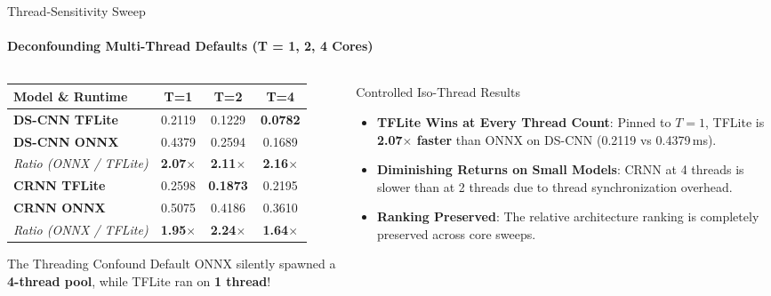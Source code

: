 \documentclass[aspectratio=169]{beamer}
\begin{document}
\begin{frame}{Thread-Sensitivity Sweep}
\framesubtitle{Deconfounding Multi-Thread Defaults (T = 1, 2, 4 Cores)}
\begin{columns}[T]
  \begin{column}{0.48\textwidth}
    \begin{table}[h]
    \centering
    \scriptsize
    \setlength{\tabcolsep}{3pt}
    \begin{tabular}{lccc}
    \toprule
    \textbf{Model \& Runtime} & \textbf{T=1} & \textbf{T=2} & \textbf{T=4} \\
    \midrule
    \textbf{DS-CNN TFLite} & 0.2119 & 0.1229 & \textbf{0.0782} \\
    \textbf{DS-CNN ONNX}   & 0.4379 & 0.2594 & 0.1689 \\
    \textit{Ratio (ONNX / TFLite)} & \textbf{2.07$\times$} & \textbf{2.11$\times$} & \textbf{2.16$\times$} \\
    \midrule
    \textbf{CRNN TFLite}   & 0.2598 & \textbf{0.1873} & 0.2195 \\
    \textbf{CRNN ONNX}     & 0.5075 & 0.4186 & 0.3610 \\
    \textit{Ratio (ONNX / TFLite)} & \textbf{1.95$\times$} & \textbf{2.24$\times$} & \textbf{1.64$\times$} \\
    \bottomrule
    \end{tabular}
    \end{table}

    \begin{alertblock}{The Threading Confound}
      \small Default ONNX silently spawned a \textbf{4-thread pool}, while TFLite ran on \textbf{1 thread}!
    \end{alertblock}
  \end{column}

  \begin{column}{0.48\textwidth}
    \begin{block}{Controlled Iso-Thread Results}
      \begin{itemize}\small
        \item \textbf{TFLite Wins at Every Thread Count}: Pinned to $T=1$, TFLite is \textbf{2.07$\times$ faster} than ONNX on DS-CNN (0.2119 vs 0.4379\,ms).
        \item \textbf{Diminishing Returns on Small Models}: CRNN at 4 threads is slower than at 2 threads due to thread synchronization overhead.
        \item \textbf{Ranking Preserved}: The relative architecture ranking is completely preserved across core sweeps.
      \end{itemize}
    \end{block}
  \end{column}
\end{columns}
\end{frame}
\end{document}
